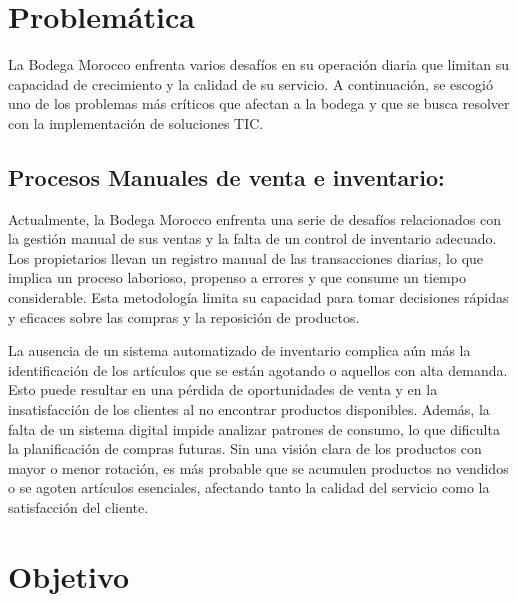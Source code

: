 \documentclass{article}
\begin{document}
\section{Problemática}

  La Bodega Morocco enfrenta varios desafíos en su operación diaria que limitan su capacidad de crecimiento y la calidad de su servicio. A continuación, se escogió uno de los problemas más críticos que afectan a la bodega y que se busca resolver con la implementación de soluciones TIC.

  \subsection{Procesos Manuales de venta e inventario:}

  Actualmente, la Bodega Morocco enfrenta una serie de desafíos relacionados con la gestión manual de sus ventas y la falta de un control de inventario adecuado. Los propietarios llevan un registro manual de las transacciones diarias, lo que implica un proceso laborioso, propenso a errores y que consume un tiempo considerable. Esta metodología limita su capacidad para tomar decisiones rápidas y eficaces sobre las compras y la reposición de productos.

  La ausencia de un sistema automatizado de inventario complica aún más la identificación de los artículos que se están agotando o aquellos con alta demanda. Esto puede resultar en una pérdida de oportunidades de venta y en la insatisfacción de los clientes al no encontrar productos disponibles. Además, la falta de un sistema digital impide analizar patrones de consumo, lo que dificulta la planificación de compras futuras. Sin una visión clara de los productos con mayor o menor rotación, es más probable que se acumulen productos no vendidos o se agoten artículos esenciales, afectando tanto la calidad del servicio como la satisfacción del cliente.

\newpage

\section{Objetivo}
\end{document}

